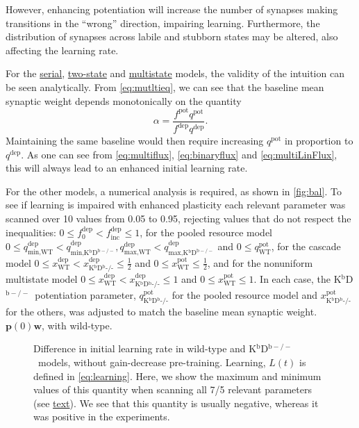 \documentclass[10pt]{article}
\newcommand{\pr}{\mathbf{p}}
\newcommand{\w}{\mathbf{w}}
\newcommand{\pot}{^{\text{pot}}}
\newcommand{\dep}{^{\text{dep}}}
\newcommand{\norm}{_0}
\newcommand{\inc}{_{\text{inc}}}
\newcommand{\wt}{_{\text{WT}}}
\newcommand{\ko}{_{\text{K$^\mathrm{b}$D$^\mathrm{b}$-/-}}}
\newcommand{\KO}{K$^\mathrm{b}$D$^{\mathrm{b}-/-}$}
\begin{document}
However, enhancing potentiation will increase the number of synapses making transitions in the ``wrong'' direction, impairing learning.
Furthermore, the distribution of synapses across labile and stubborn states may be altered, also affecting the learning rate.

For the \hyperref[sec:multistate]{serial}, \hyperref[sec:binary]{two-state} and \hyperref[sec:multistate_lin]{multistate} models, the validity of the intuition can be seen analytically.
From \eqref{eq:mutltieq}, we can see that the baseline mean synaptic weight depends monotonically on the quantity
%
\begin{equation*}
  \alpha=\frac{f\pot q\pot}{f\dep q\dep}.
\end{equation*}
%
Maintaining the same baseline would then require increasing $q\pot$ in proportion to $q\dep$.
As one can see from \eqref{eq:multiflux}, \eqref{eq:binaryflux} and \eqref{eq:multiLinFlux}, this will always lead to an enhanced initial learning rate.

For the other models, a numerical analysis is required, as shown in \autoref{fig:bal}.
\hypertarget{par:bal_scan}{To} see if learning is impaired with enhanced plasticity each relevant parameter was scanned over 10 values from 0.05 to 0.95, rejecting values that do not respect the inequalities:
$0 \leq f\dep\norm < f\dep\inc \leq 1$, for the pooled resource model $0 \leq q\dep_\text{min,WT} < q\dep_\text{min,\KO}, q\dep_\text{max,WT} < q\dep_\text{max,\KO}$ and $0 \leq q\pot\wt$, for the cascade model $0 \leq x\dep\wt < x\dep\ko \leq \frac{1}{2}$ and $0 \leq x\pot\wt \leq \frac{1}{2}$, and for the nonuniform multistate model $0 \leq x\dep\wt < x\dep\ko \leq 1$ and $0 \leq x\pot\wt \leq 1$.
In each case, the \KO\ potentiation parameter, $q\pot\ko$ for the pooled resource model and $x\pot\ko$ for the others, was adjusted to match the baseline mean synaptic weight. $\pr(0)\w$, with wild-type.






\begin{figure}
  \centering
  \begin{myenuma}
    \item{}\label{fig:pooled_bal}
    \item{}\label{fig:cascade_bal}
    \item{}\label{fig:nonuni_bal}
  \end{myenuma}
  \caption{Difference in initial learning rate in wild-type and \KO\ models, without gain-decrease pre-training.
  Learning, $L(t)$ is defined in \eqref{eq:learning}.
  Here, we show the maximum and minimum values of this quantity when scanning all 7/5 relevant parameters (see \protect\hyperlink{par:bal_scan}{text}).
  We see that this quantity is usually negative, whereas it was positive in the experiments.
  }\label{fig:bal}
\end{figure}








\end{document}
